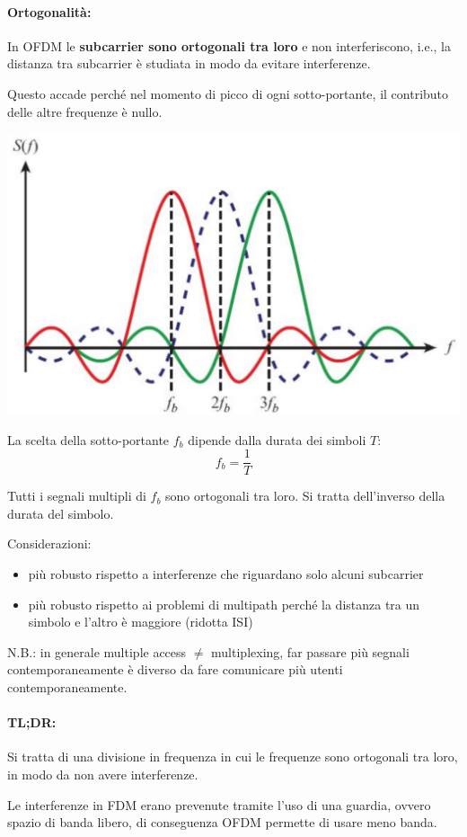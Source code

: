 \paragraph{Ortogonalità:} In OFDM le \textbf{subcarrier sono ortogonali tra loro} e non interferiscono, i.e., la distanza tra subcarrier è studiata in modo da evitare interferenze. 

Questo accade perché nel momento di picco di ogni sotto-portante, il contributo delle altre frequenze è nullo.
\begin{center}
	\includegraphics[width=0.6\linewidth]{img/wireless/OFDM2}
\end{center}

La scelta della sotto-portante $f_b$ dipende dalla durata dei simboli $T$:
$$ f_b = \frac{1}{T} $$

Tutti i segnali multipli di $f_b$ sono ortogonali tra loro. Si tratta dell'inverso della durata del simbolo.

Considerazioni:
\begin{itemize}
	\item più robusto rispetto a interferenze che riguardano solo alcuni subcarrier
    
	\item più robusto rispetto ai problemi di multipath perché la distanza tra un simbolo e l'altro è maggiore (ridotta ISI)
\end{itemize}

N.B.: in generale multiple access $\neq$ multiplexing, far passare più segnali contemporaneamente è diverso da fare comunicare più utenti contemporaneamente.

\paragraph{TL;DR:} Si tratta di una divisione in frequenza in cui le frequenze sono ortogonali tra loro, in modo da non avere interferenze. 

Le interferenze in FDM erano prevenute tramite l'uso di una guardia, ovvero spazio di banda libero, di conseguenza OFDM permette di usare meno banda.

